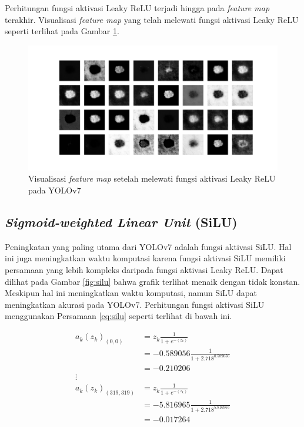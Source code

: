     Perhitungan fungsi aktivasi Leaky ReLU terjadi hingga pada \textit{feature map} terakhir. Visualisasi \textit{feature map} yang telah melewati fungsi aktivasi Leaky ReLU seperti terlihat pada Gambar \ref{fig:d-lrelu}.

    \begin{figure}[H]
        \begin{center}
            \includegraphics[width=12cm]{img/bab4/lrelu-layer.png}
            \caption{Visualisasi \textit{feature map} setelah melewati fungsi aktivasi Leaky ReLU pada YOLOv7}
            \label{fig:d-lrelu}
        \end{center}
    \end{figure}

    \subsection{\textit{Sigmoid-weighted Linear Unit} (SiLU)}
    Peningkatan yang paling utama dari YOLOv7 adalah fungsi aktivasi SiLU. Hal ini juga meningkatkan waktu komputasi karena fungsi aktivasi SiLU memiliki persamaan yang lebih kompleks daripada fungsi aktivasi Leaky ReLU. Dapat dilihat pada Gambar \ref{fig:silu} bahwa grafik terlihat menaik dengan tidak konstan. Meskipun hal ini meningkatkan waktu komputasi, namun SiLU dapat meningkatkan akurasi pada YOLOv7. Perhitungan fungsi aktivasi SiLU menggunakan Persamaan \ref{eq:silu} seperti terlihat di bawah ini.

    \begin{align*}
        a_k(z_k)_{(0, 0)}       &= z_k\frac{1}{1+e^{-(z_k)}} \\
                                &= -0.589056\frac{1}{1+2.718^{0.589056}} \\
                                &= -0.210206 \\
        \vdots \\
        a_k(z_k)_{(319, 319)}   &= z_k\frac{1}{1+e^{-(z_k)}} \\
                                &= -5.816965\frac{1}{1+2.718^{5.816965}} \\
                                &= -0.017264 \\
    \end{align*}

